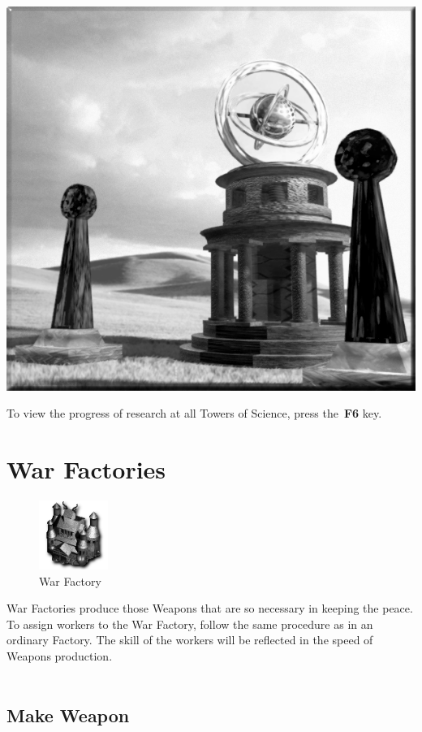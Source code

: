 \begin{center}
	\includegraphics[width=0.7\linewidth]{Atower}
\end{center}

To view the progress of research at all Towers of Science, press the \textbf{F6} key.

\section{War Factories}

\begin{figure}
	\vspace{-20pt}
	\begin{center}
		\includegraphics[width=0.2\textwidth]{Iwarfactory}
		\\ War Factory
	\end{center}
	\vspace{-20pt}
\end{figure}

War Factories produce those Weapons that are so necessary in keeping the peace. To assign workers to the War Factory, follow the same procedure as in an ordinary Factory. The skill of the workers will be reflected in the speed of Weapons production. \\ \\

\subsection{Make Weapon}

